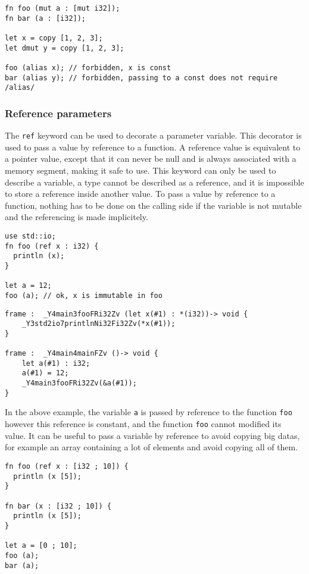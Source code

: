 \begin{lstlisting}[style=coloredverbatim]
fn foo (mut a : [mut i32]);
fn bar (a : [i32]);

let x = copy [1, 2, 3];
let dmut y = copy [1, 2, 3];

foo (alias x); // forbidden, x is const
bar (alias y); // forbidden, passing to a const does not require /alias/
\end{lstlisting}

\subsubsection {Reference parameters}

The \texttt{ref} keyword can be used to decorate a parameter variable. This
decorator is used to pass a value by reference to a function. A reference value
is equivalent to a pointer value, except that it can never be null and is always
associated with a memory segment, making it safe to use. This keyword can only
be used to describe a variable, a type cannot be described as a reference, and
it is impossible to store a reference inside another value. To pass a value by
reference to a function, nothing has to be done on the calling side if the
variable is not mutable and the referencing is made implicitely.

\begin{lstlisting}[style=coloredverbatim]
use std::io;
fn foo (ref x : i32) {
  println (x);
}

let a = 12;
foo (a); // ok, x is immutable in foo
\end{lstlisting}

\begin{lstlisting}[style=intermediateVerb]
frame :  _Y4main3fooFRi32Zv (let x(#1) : *(i32))-> void {
    _Y3std2io7printlnNi32Fi32Zv(*x(#1));
}

frame :  _Y4main4mainFZv ()-> void {
    let a(#1) : i32;
    a(#1) = 12;
    _Y4main3fooFRi32Zv(&a(#1));
}
\end{lstlisting}

In the above example, the variable \texttt{a} is passed by reference to the
function \texttt{foo} however this reference is constant, and the function
\texttt{foo} cannot modified its value. It can be useful to pass a variable by
reference to avoid copying big datas, for example an array containing a lot of
elements and avoid copying all of them.

\begin{lstlisting}[style=coloredverbatim]
fn foo (ref x : [i32 ; 10]) {
  println (x [5]);
}

fn bar (x : [i32 ; 10]) {
  println (x [5]);
}

let a = [0 ; 10];
foo (a);
bar (a);
\end{lstlisting}

